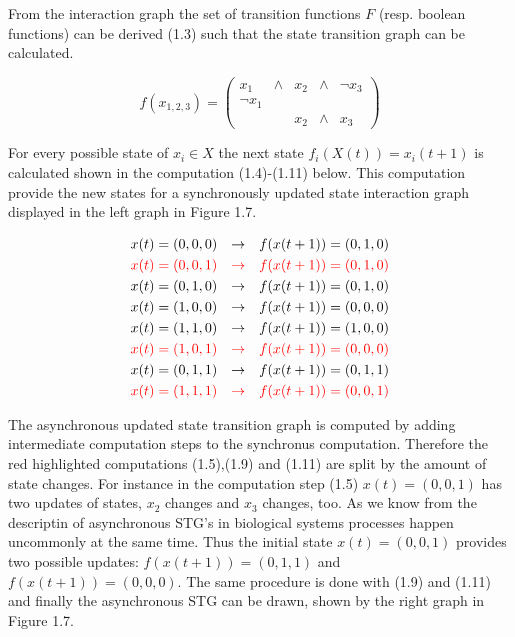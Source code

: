 From the interaction graph the set of transition functions $F$ (resp. boolean functions) can be derived (1.3) such that the state transition graph can be calculated.

\begin{equation}
f(x_{1,2,3}) = 
\begin{pmatrix}
x_1      & \land & x_2 & \land &\neg x_3\\
\neg x_1 &       &      &       & \\
         &       & x_2  &\land & x_3
\end{pmatrix}
\end{equation}


For every possible state of $x_i\in X$ the next state $f_{i}(X(t))=x_{i}(t+1)$ is calculated shown in the computation (1.4)-(1.11) below. This computation provide the new states for a synchronously updated state interaction graph displayed in the left graph in Figure 1.7.%


\begin{align}
x(t)& =(0,0,0) &\rightarrow & &f(x(t+1)) = (0,1,0)\\
\color{red}x(t)& \color{red}=(0,0,1) &\color{red}\rightarrow & &\color{red}f(x(t+1)) = (0,1,0)\\
x(t)& =(0,1,0) &\rightarrow & &f(x(t+1)) = (0,1,0)\\
x(t)& =(1,0,0) &\rightarrow & &f(x(t+1)) = (0,0,0)\\
x(t)& =(1,1,0) &\rightarrow & &f(x(t+1)) = (1,0,0)\\
\color{red}x(t)& \color{red}=(1,0,1) &\color{red}\rightarrow & &\color{red}f(x(t+1)) = (0,0,0)\\
x(t)& =(0,1,1) &\rightarrow & &f(x(t+1)) = (0,1,1)\\
\color{red}x(t)& \color{red}=(1,1,1) &\color{red}\rightarrow & &\color{red}f(x(t+1)) = (0,0,1)
\end{align}

The asynchronous updated state transition graph is computed by adding intermediate computation steps to the synchronus computation. Therefore the red highlighted computations (1.5),(1.9) and (1.11) are split by the amount of state changes. For instance in the computation step (1.5) $x(t)=(0,0,1)$ has two updates of states, $x_2$ changes and $x_3$ changes, too. As we know from the descriptin of asynchronous STG's in biological systems processes happen uncommonly at the same time. Thus the initial state $x(t)=(0,0,1)$ provides two possible updates: $f(x(t+1))=(0,1,1)$ and $f(x(t+1))=(0,0,0)$. The same procedure is done with (1.9) and (1.11) and finally the asynchronous STG can be drawn, shown by the right graph in Figure 1.7. 

